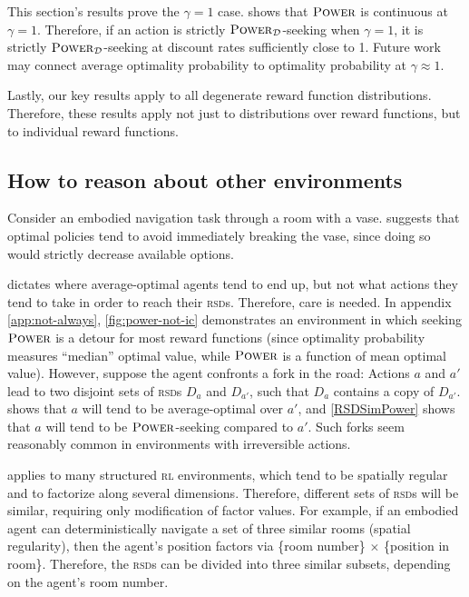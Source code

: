 \documentclass{article}
\newcommand*{\rsd}[1][r]{{\textsc{#1sd}}}
\newcommand*{\rl}[1][r]{{\textsc{#1l}}}
\newcommand*{\D}{\mathcal{D}} %
\theoremstyle{definition}
\begin{document}
This section's results prove the $\gamma=1$ case.  shows that $\text{\upshape\textsc{Power}}$ is continuous at  $\gamma=1$. Therefore, if an action is strictly $\pwrNoDist_\D$-seeking when $\gamma=1$, it is strictly $\pwrNoDist_\D$-seeking at discount rates sufficiently close to 1. Future work may connect average optimality probability to optimality probability at $\gamma\approx 1$. 

Lastly, our key results apply to all degenerate reward function distributions. Therefore, these results apply not just to distributions over reward functions, but to  individual reward functions.

\subsection{How to reason about other environments}
Consider an embodied navigation task through a room with a vase.  suggests that optimal policies tend to avoid immediately breaking the vase, since doing so would strictly decrease available options.

 dictates where average-optimal agents tend to end up, but not what actions they tend to take in order to reach their {\rsd}s. Therefore, care is needed. In appendix \ref{app:not-always}, \cref{fig:power-not-ic} demonstrates an environment in which seeking $\text{\upshape\textsc{Power}}$ is a detour for most reward functions (since optimality probability measures ``median'' optimal value, while $\text{\upshape\textsc{Power}}$ is a function of mean optimal value). However, suppose the agent confronts a fork in the road: Actions $a$ and $a'$ lead to two disjoint sets of {\rsd}s $D_{a}$ and $D_{a'}$, such that $D_a$ contains a copy of $D_{a'}$.  shows that $a$ will tend to be average-optimal over $a'$, and \cref{RSDSimPower} shows that $a$ will tend to be $\text{\upshape\textsc{Power}}$-seeking compared to $a'$. Such forks seem reasonably common in environments with irreversible actions.

 applies to many structured {\rl} environments, which tend to be spatially regular and to factorize along several dimensions. Therefore,  different sets of {\rsd}s will be similar, requiring only modification of factor values. For example, if an embodied agent can deterministically navigate a set of three similar rooms (spatial regularity), then the agent's position factors via \{room number\} $\times$ \{position in room\}. Therefore, the {\rsd}s can be divided into three similar subsets, depending on the agent’s room number.
\end{document}
